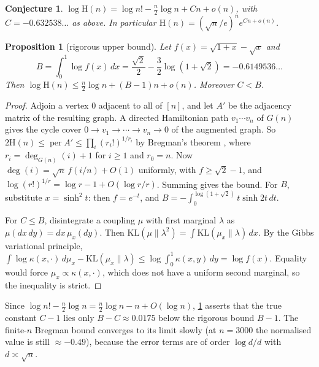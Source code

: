 \documentclass[11pt]{amsart}
\newtheorem{proposition}[theorem]{Proposition}
\newtheorem{conjecture}[theorem]{Conjecture}
\theoremstyle{definition}
\newcommand{\Ham}{\mathrm{H}}
\newcommand{\KL}{\mathrm{KL}}
\begin{document}
\begin{conjecture}\label{conj:asymp}
$\log\Ham(n)=\log n!-\frac n2\log n+Cn+o(n)$, with $C=-0.632538\ldots$ as above.
In particular $\Ham(n)=(\sqrt n/e)^{n}e^{Cn+o(n)}$.
\end{conjecture}

\begin{proposition}[rigorous upper bound]\label{prop:bregman}
Let $f(x)=\sqrt{1+x}-\sqrt x$ and
\[
B=\int_0^1\log f(x)\,dx=\frac{\sqrt2}{2}-\frac32\log(1+\sqrt2)=-0.6149536\ldots
\]
Then $\log\Ham(n)\le\frac n2\log n+(B-1)n+o(n)$. Moreover $C<B$.
\end{proposition}
\begin{proof}
Adjoin a vertex $0$ adjacent to all of $[n]$, and let $A'$ be the adjacency matrix of
the resulting graph. A directed Hamiltonian path $v_1\cdots v_n$ of $G(n)$ gives the
cycle cover $0\to v_1\to\cdots\to v_n\to0$ of the augmented graph. So
$2\Ham(n)\le\operatorname{per}A'\le\prod_i (r_i!)^{1/r_i}$ by Bregman's theorem
\cite{Bregman}, where $r_i=\deg_{G(n)}(i)+1$ for $i\ge1$ and $r_0=n$. Now
$\deg(i)=\sqrt n\,f(i/n)+O(1)$ uniformly, with $f\ge\sqrt2-1$, and
$\log (r!)^{1/r}=\log r-1+O(\log r/r)$. Summing gives the bound. For $B$, substitute
$x=\sinh^2t$: then $f=e^{-t}$, and $B=-\int_0^{\log(1+\sqrt2)}t\sinh 2t\,dt$.

For $C\le B$, disintegrate a coupling $\mu$ with first marginal $\lambda$ as
$\mu(dx\,dy)=dx\,\mu_x(dy)$. Then $\KL(\mu\|\lambda^2)=\int\KL(\mu_x\|\lambda)\,dx$.
By the Gibbs variational principle,
$\int\log\kappa(x,\cdot)\,d\mu_x-\KL(\mu_x\|\lambda)\le\log\int_0^1\kappa(x,y)\,dy=\log f(x)$.
Equality would force $\mu_x\propto\kappa(x,\cdot)$, which does not have a uniform second
marginal, so the inequality is strict.
\end{proof}
Since $\log n!-\frac n2\log n=\frac n2\log n-n+O(\log n)$, \cref{conj:asymp}
asserts that the true constant $C-1$ lies only $B-C\approx0.0175$ below the rigorous
bound $B-1$. The finite-$n$ Bregman bound converges to its limit slowly (at $n=3000$
the normalised value is still $\approx-0.49$), because the error terms are of order
$\log d/d$ with $d\asymp\sqrt n$.
\end{document}
